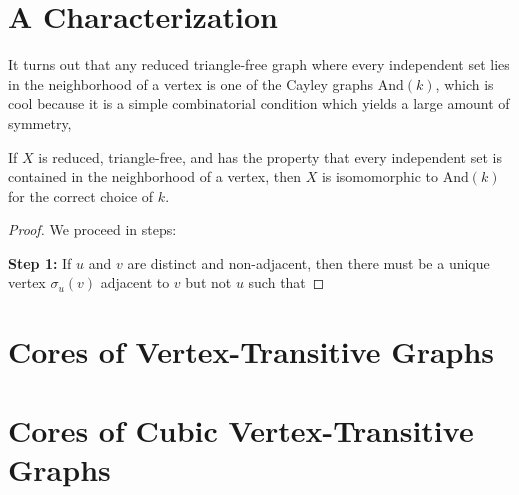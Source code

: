 \section*{A Characterization}

It turns out that any reduced triangle-free graph where every independent set lies in the neighborhood of a vertex is one of the Cayley graphs $\mathrm{And}(k)$, which is cool because it is a simple combinatorial condition which yields a large amount of symmetry,

\begin{theorem}
	If $X$ is reduced, triangle-free, and has the property that every independent set is contained in the neighborhood of a vertex, then $X$ is isomomorphic to $\mathrm{And}(k)$ for the correct choice of $k$.
\end{theorem}
\begin{proof}
	We proceed in steps:
	
	\textbf{Step 1:} If $u$ and $v$ are distinct and non-adjacent, then there must be a unique vertex $\sigma_u(v)$ adjacent to $v$ but not $u$ such that 
\end{proof}
\section*{Cores of Vertex-Transitive Graphs}

\section*{Cores of Cubic Vertex-Transitive Graphs}

